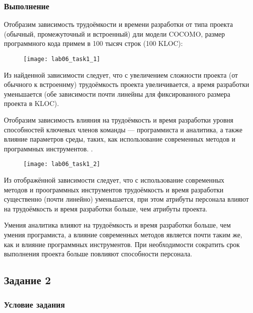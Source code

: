 \subsubsection{Выполнение}

Отобразим зависимость трудоёмкости и времени разработки от типа проекта (обычный, промежуточный и встроенный) дли модели COCOMO, размер программного кода примем в 100 тысяч строк (100 KLOC):
\begin{figure}[h!]
	\texttt{[image: lab06\_task1\_1]}
\end{figure}

Из найденной зависимости следует, что с увеличением сложности проекта (от обычного к встроеннму) трудоёмкость проекта увеличивается, а время разработки уменьшается (обе зависимости почти линейны для фиксированного размера проекта в KLOC).

Отобразим зависимость влияния на трудоёмкость и время разработки уровня способностей ключевых членов команды --- программиста и аналитика, а также влияние  параметров среды, таких, как использование современных методов и программных инструментов.
.
\clearpage

\begin{figure}[h!]
	\texttt{[image: lab06\_task1\_2]}
\end{figure}

Из отображённой зависимости следует, что с использование современных методов и проограммных инструментов трудоёмкость и время разработки существенно (почти линейно) уменьшается, при этом атрибуты персонала влияют на трудоёмкость и время разработки больше, чем атрибуты проекта. 

Умения аналитика влияют на трудоёмкость и время разработки больше, чем умения програмиста, а влияние современных методов является почти таким же, как и влияние программных инструментов. При необходимости сократить срок выполнения проекта больше повлияют способности персонала.

\subsection*{Задание 2}

\subsubsection{Условие задания}

